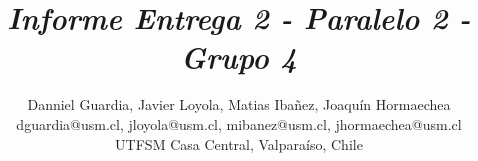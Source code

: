 \documentclass[journal, 12pt, onecolumn]{IEEEtran}
\begin{document}
	
	\title{\textit{Informe Entrega 2 - Paralelo 2 - Grupo 4}}
	
	\author{
		Danniel Guardia, Javier Loyola, Matias Ibañez, Joaquín Hormaechea \\
		dguardia@usm.cl, jloyola@usm.cl, mibanez@usm.cl, jhormaechea@usm.cl\\
		UTFSM Casa Central, Valpara\'iso, Chile
	}
	
	\maketitle
	
	
	
	
	
	
	
	
\end{document}
